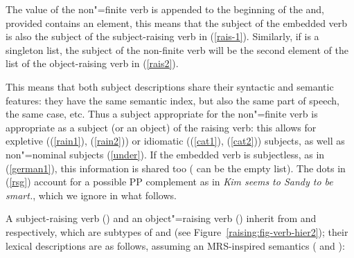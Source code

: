 \eal
\label{rsg}
\ex {} \impl
\avm{ [ \argst  \1 \+ < \ldots, [subj & \1 ] >  ]} \label{rais-1}
\ex {}  \impl
\avm{ [ \argst  < NP > \+ \1 \+ < [subj & \1 ] > ]} \label{rais2}
\zl

\largerpage[-1]
\noindent
The \subj value of the non"=finite verb is appended to the beginning of the \argst and, provided
 contains an element, this means that the subject of the embedded verb is also the subject
of the subject-raising verb in (\ref{rais-1}). Similarly, if  is a singleton list, the subject of the
non-finite verb will be the second element of the \argst list of the object-raising verb in (\ref{rais2}).

This means that  both subject descriptions share their syntactic and semantic features: they have the
same semantic index, but also the same part of speech, the same case, etc. Thus a subject appropriate for the
non"=finite verb is appropriate as a subject (or an object) of the raising verb: this allows for
expletive ((\ref{rain1}), (\ref{rain2})) or idiomatic ((\ref{cat1}), (\ref{cat2})) subjects, as well
as non"=nominal subjects (\ref{under}). If the embedded verb is subjectless, as in (\ref{german1}),
this information is shared too ( can be the empty list). The dots in (\ref{rsg}) account for
a possible PP complement as in \textit{Kim seems to Sandy to be smart.}, which we ignore in what
follows.

A subject-raising verb () and an object"=raising verb () inherit from
 and 
 respectively, which are subtypes of  and  (see Figure~\ref{raising:fig-verb-hier2}); their lexical descriptions are as follows,
assuming an MRS-inspired semantics (\citealp{CFPS2005a} and ):

